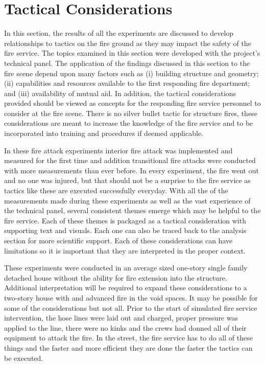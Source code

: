 \documentclass[12pt,oneside]{book}
\begin{document}
\clearpage

\chapter{Tactical Considerations}

In this section, the results of all the experiments are discussed to develop relationships to tactics on the fire ground as they may impact the safety of the fire service. The topics examined in this section were developed with the project's technical panel. The application of the findings discussed in this section to the fire scene depend upon many factors such as (i) building structure and geometry; (ii) capabilities and resources available to the first responding fire department; and (iii) availability of mutual aid. In addition, the tactical considerations provided should be viewed as concepts for the responding fire service personnel to consider at the fire scene. There is no silver bullet tactic for structure fires, these considerations are meant to increase the knowledge of the fire service and to be incorporated into training and procedures if deemed applicable. 

In these fire attack experiments interior fire attack was implemented and measured for the first time and addition transitional fire attacks were conducted with more measurements than ever before.  In every experiment, the fire went out and no one was injured, but that should not be a surprise to the fire service as tactics like these are executed successfully everyday.  With all the of the measurements made during these experiments as well as the vast experience of the technical panel, several consistent themes emerge which may be helpful to the fire service. Each of these themes is packaged as a tactical consideration with supporting text and visuals. Each one can also be traced back to the analysis section for more scientific support. Each of these considerations can have limitations so it is important that they are interpreted in the proper context.  

These experiments were conducted in an average sized one-story single family detached house without the ability for fire extension into the structure.  Additional interpretation will be required to expand these considerations to a two-story house with and advanced fire in the void spaces. It may be possible for some of the considerations but not all.  Prior to the start of simulated fire service intervention, the hose lines were laid out and charged, proper pressure was applied to the line, there were no kinks and the crews had donned all of their equipment to attack the fire. In the street, the fire service has to do all of these things and the faster and more efficient they are done the faster the tactics can be executed. 
\end{document}
